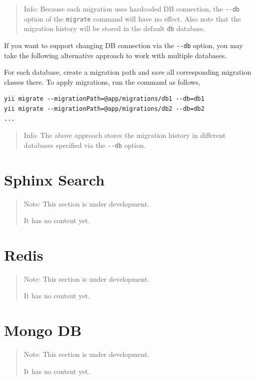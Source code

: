 \begin{quote}Info: Because each migration uses hardcoded DB connection, the \lstinline|--db| option of the \lstinline|migrate| command will
  have no effect. Also note that the migration history will be stored in the default \lstinline|db| database.

\end{quote}
If you want to support changing DB connection via the \lstinline|--db| option, you may take the following alternative
approach to work with multiple databases.

For each database, create a migration path and save all corresponding migration classes there. To apply migrations,
run the command as follows,

\begin{lstlisting}
yii migrate --migrationPath=@app/migrations/db1 --db=db1
yii migrate --migrationPath=@app/migrations/db2 --db=db2
...
\end{lstlisting}
\begin{quote}Info: The above approach stores the migration history in different databases specified via the \lstinline|--db| option.

\end{quote}


\label{db-sphinx.md}\section{Sphinx Search}
\begin{quote}Note: This section is under development.

It has no content yet.

\end{quote}


\label{db-redis.md}\section{Redis}
\begin{quote}Note: This section is under development.

It has no content yet.

\end{quote}


\label{db-mongodb.md}\section{Mongo DB}
\begin{quote}Note: This section is under development.

It has no content yet.

\end{quote}


